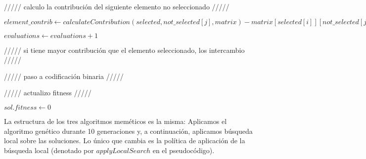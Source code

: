 \documentclass[10pt,a4paper]{article}
\begin{document}
\begin{algorithm}[H]
{{{{					\hfill ///// calculo la contribución del siguiente elemento no seleccionado /////
					
					$element\_contrib \gets calculateContribution(selected, not\_selected[j], matrix) - matrix[selected[i]][not\_selected[j]]$
					
					$evaluations \gets evaluations + 1$
					
					\hfill ///// si tiene mayor contribución que el elemento seleccionado, los intercambio /////
					
				}
			}
		}
		
		\hfill ///// paso a codificación binaria /////
		
	
		
		\hfill ///// actualizo fitness /////
		
		$sol.fitness \gets 0$
		
	}
\end{algorithm}

La estructura de los tres algoritmos meméticos es la misma: Aplicamos el algoritmo genético durante 10 generaciones y, a continuación, aplicamos búsqueda local sobre las soluciones. Lo único que cambia es la política de aplicación de la búsqueda local (denotado por $applyLocalSearch$ en el pseudocódigo).
\end{document}
